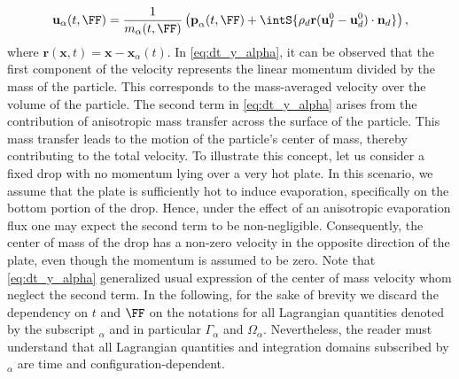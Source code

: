 \begin{equation}
    \textbf{u}_\alpha(t,\FF) = \frac{1}{m_\alpha(t,\FF)} \left(
        \textbf{p}_\alpha(t,\FF)
        +  \intS{\rho_d \textbf{r} (\textbf{u}_I^0 - \textbf{u}_d^0)\cdot \textbf{n}_d }
        \right),
        \label{eq:dt_y_alpha}
\end{equation}
where $\textbf{r}(\textbf{x},t) = \textbf{x} - \textbf{x}_\alpha(t)$. 
In \ref{eq:dt_y_alpha}, it can be observed that the first component of the velocity represents the linear momentum divided by the mass of the particle. 
This corresponds to the mass-averaged velocity over the volume of the particle.
The second term in \ref{eq:dt_y_alpha} arises from the contribution of anisotropic mass transfer across the surface of the particle. 
This mass transfer leads to the motion of the particle's center of mass, thereby contributing to the total velocity.
To illustrate this concept, let us consider a fixed drop with no momentum lying over a very hot plate.
In this scenario, we assume that the plate is sufficiently hot to induce evaporation, specifically on the bottom portion of the drop.
Hence, under the effect of an anisotropic evaporation flux one may expect the second term to be non-negligible.
Consequently, the center of mass of the drop has a non-zero velocity in the opposite direction of the plate, even though the momentum is assumed to be zero.
Note that \ref{eq:dt_y_alpha} generalized usual expression of the center of mass velocity whom neglect the second term.
In the following, for the sake of brevity we discard the dependency on $t$ and $\FF$ on the notations for all Lagrangian quantities denoted by the subscript $_\alpha$ and in particular $\Gamma_\alpha$ and $\Omega_\alpha$.
Nevertheless, the reader must understand that all Lagrangian quantities and integration domains subscribed by $_\alpha$ are time and configuration-dependent. 

